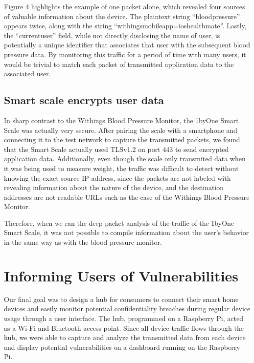 Figure 4 highlights the example of one packet alone, which revealed four sources of valuable information about the device. The plaintext string ``blood\textunderscore pressure'' appears twice, along with the string ``withings\textunderscore mobile\textunderscore app=ios\textunderscore healthmate''. Lastly, the ``current\textunderscore user'' field, while not directly disclosing the name of user, is potentially a unique identifier that associates that user with the subsequent blood pressure data. By monitoring this traffic for a period of time with many users, it would be trivial to match each packet of transmitted application data to the associated user. 

\subsection{Smart scale encrypts user data}
In sharp contrast to the Withings Blood Pressure Monitor, the 1byOne Smart Scale was actually very secure. After pairing the scale with a smartphone and connecting it to the test network to capture the transmitted packets, we found that the Smart Scale actually used TLSv1.2 on port 443 to send encrypted application data. Additionally, even though the scale only transmited data when it was being used to measure weight, the traffic was difficult to detect without knowing the exact source IP address, since the packets are not labeled with revealing information about the nature of the device, and the destination addresses are not readable URLs such as the case of the Withings Blood Pressure Monitor. 

Therefore, when we ran the deep packet analysis of the traffic of the 1byOne Smart Scale, it was not possible to compile information about the user's behavior in the same way as with the blood pressure monitor. 


\section{Informing Users of Vulnerabilities}

Our final goal was to design a hub for consumers to connect their smart home devices and easily monitor potential confidentiality breaches during regular device usage through a user interface. The hub, programmed on a Raspberry Pi, acted as a Wi-Fi and Bluetooth access point. Since all device traffic flows through the hub, we were able to capture and analyze the transmitted data from each device and display potential vulnerabilities on a dashboard running on the Raspberry Pi. 

